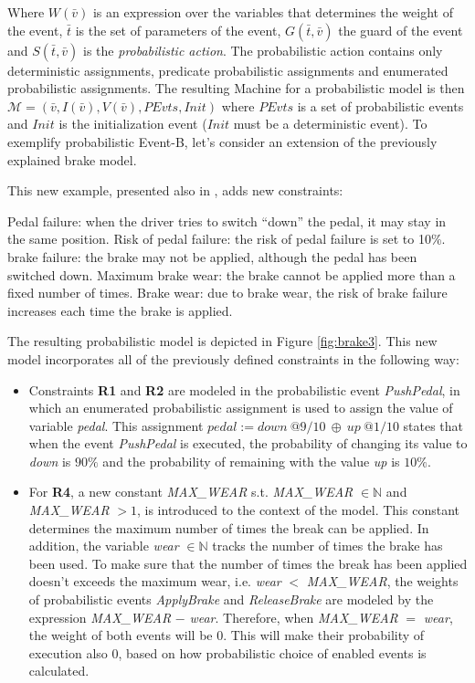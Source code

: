 Where $W( \bar{v})$ is an expression over the variables that determines the weight of the event, $\bar{t}$ is the set of parameters of the event, $G(\bar{t}, \bar{v})$ the guard of the event and $S(\bar{t}, \bar{v})$ is the \textit{probabilistic action}. The probabilistic action contains only deterministic assignments, predicate probabilistic assignments and enumerated probabilistic assignments. The resulting Machine for a probabilistic model is then $\mathscr{M} =(\bar{v}, I(\bar{v}), V(\bar{v}), PEvts, Init)$ where $PEvts$ is a set of probabilistic events and $Init$ is the initialization event ($Init$ must be a deterministic event). To exemplify probabilistic Event-B, let's consider an extension of the previously explained brake model. 

\begin{example}
\normalfont
This new example, presented also in \cite{Aouadhi2017}, adds new constraints:
\begin{itemize}
    \itema Pedal failure: when the driver tries to switch “down” the pedal, it may stay in the same position.
    \itemb Risk of pedal failure: the risk of pedal failure is set to 10\%.
    \itemc brake failure: the brake may not be applied, although the pedal has been switched down.
    \itemd Maximum brake wear: the brake cannot be applied more than a fixed number of times.
    \iteme Brake wear: due to brake wear, the risk of brake failure increases each time the brake is applied.
\end{itemize}
The resulting probabilistic model is depicted in Figure \ref{fig:brake3}. This new model incorporates all of the previously defined constraints in the following way:
\begin{itemize}
    \item Constraints \textbf{R1} and \textbf{R2} are modeled in the probabilistic event \textit{PushPedal}, in which an enumerated probabilistic assignment is used to assign the value of variable \textit{pedal}. This assignment $pedal := down \ @9/10  \ \oplus \ up \ @1/10$ states that when the event \textit{PushPedal} is executed, the probability of changing its value to \textit{down} is $90\%$ and the probability of remaining with the value \textit{up} is $10\%$.
    \item For \textbf{R4}, a new constant \textit{MAX\_WEAR} s.t. \textit{MAX\_WEAR} $\in \mathbb{N}$ and \textit{MAX\_WEAR} $> 1$, is introduced to the context of the model. This constant determines the maximum number of times the break can be applied. In addition, the variable \textit{wear} $\in \mathbb{N}$ tracks the number of times the brake has been used. To make sure that the number of times the break has been applied doesn't exceeds the maximum wear, i.e. \textit{wear} $<$ \textit{MAX\_WEAR}, the weights of probabilistic events \textit{ApplyBrake} and \textit{ReleaseBrake} are modeled by the expression \textit{MAX\_WEAR} $-$ \textit{wear}. Therefore, when \textit{MAX\_WEAR} $=$ \textit{wear}, the weight of both events will be 0. This will make their probability of execution also 0, based on how probabilistic choice of enabled events is calculated.

\end{itemize}
\end{example}
